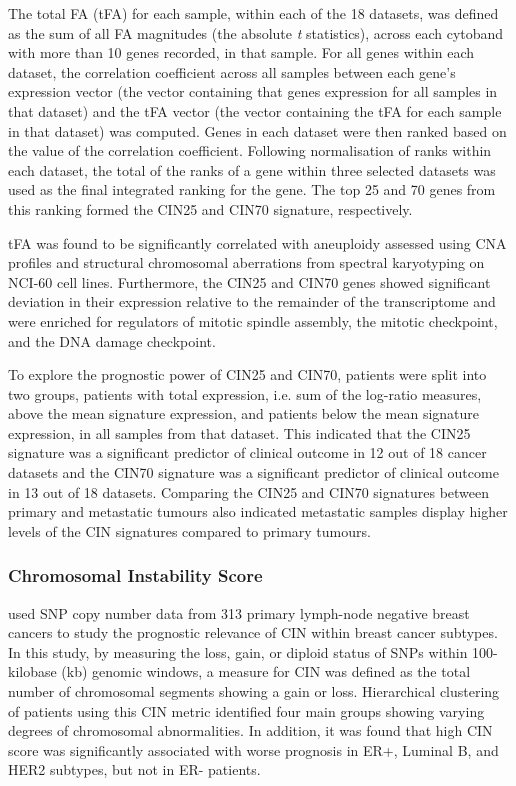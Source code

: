 The total FA (tFA) for each sample, within each of the 18 datasets, was defined as the sum of all FA magnitudes (the absolute \textit{t} statistics), across each cytoband with more than 10 genes recorded, in that sample. For all genes within each dataset, the correlation coefficient across all samples between each gene's expression vector (the vector containing that genes expression for all samples in that dataset) and the tFA vector (the vector containing the tFA for each sample in that dataset) was computed. Genes in each dataset were then ranked based on the value of the correlation coefficient. Following normalisation of ranks within each dataset, the total of the ranks of a gene within three selected datasets was used as the final integrated ranking for the gene. The top 25 and 70 genes from this ranking formed the CIN25 and CIN70 signature, respectively.

tFA was found to be significantly correlated with aneuploidy assessed using CNA profiles and structural chromosomal aberrations from spectral karyotyping on NCI-60 cell lines. Furthermore, the CIN25 and CIN70 genes showed significant deviation in their expression relative to the remainder of the transcriptome and were enriched for regulators of mitotic spindle assembly, the mitotic checkpoint, and the DNA damage checkpoint.

To explore the prognostic power of CIN25 and CIN70, patients were split into two groups, patients with total expression, i.e. sum of the log-ratio measures, above the mean signature expression, and patients below the mean signature expression, in all samples from that dataset. This indicated that the CIN25 signature was a significant predictor of clinical outcome in 12 out of 18 cancer datasets and the CIN70 signature was a significant predictor of clinical outcome in 13 out of 18 datasets. Comparing the CIN25 and CIN70 signatures between primary and metastatic tumours also indicated metastatic samples display higher levels of the CIN signatures compared to primary tumours.

\subsubsection{Chromosomal Instability Score}
\cite{pmid20632083} used SNP copy number data from 313 primary lymph-node negative breast cancers to study the prognostic relevance of CIN within breast cancer subtypes. In this study, by measuring the loss, gain, or diploid status of SNPs within 100-kilobase (kb) genomic windows, a measure for CIN was defined as the total number of chromosomal segments showing a gain or loss. Hierarchical clustering of patients using this CIN metric identified four main groups showing varying degrees of chromosomal abnormalities. In addition, it was found that high CIN score was significantly associated with worse prognosis in ER+, Luminal B, and HER2 subtypes, but not in ER- patients. 

